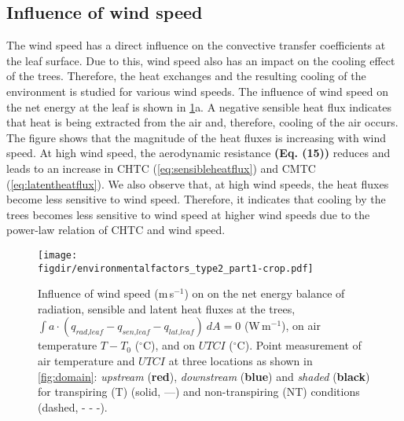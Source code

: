 \subsection{Influence of wind speed}

The wind speed has a direct influence on the convective transfer coefficients at the leaf surface. Due to this, wind speed also has an impact on the cooling effect of the trees. Therefore, the heat exchanges and the resulting cooling of the environment is studied for various wind speeds. The influence of wind speed on the net energy at the leaf is shown in \cref{fig:environmentalfactorspart1}a. A negative sensible heat flux indicates that heat is being extracted from the air and, therefore, cooling of the air occurs. The figure shows that the magnitude of the heat fluxes is increasing with wind speed. At high wind speed, the aerodynamic resistance \textbf{(Eq. (15))} reduces and leads to an increase in CHTC (\cref{eq:sensibleheatflux}) and CMTC (\cref{eq:latentheatflux}). We also observe that, at high wind speeds, the heat fluxes become less sensitive to wind speed. Therefore, it indicates that cooling by the trees becomes less sensitive to wind speed at higher wind speeds due to the power-law relation of CHTC and wind speed. 

	\begin{figure}[t]
	\centering
	\texttt{[image: \\figdir/environmentalfactors\_type2\_part1-crop.pdf]}
	\caption{Influence of wind speed (m\,s$^{-1}$) on   on the net energy balance of radiation, sensible and latent heat fluxes at the trees, $\int a \cdot (q_{\textit{rad,leaf}}-q_{\textit{sen,leaf}}-q_{\textit{lat,leaf}})\ dA = 0$ (W\,m$^{-1}$),  on air temperature $T-T_0$ ($^{\circ}$C), and  on $\textit{UTCI}$ ($^{\circ}$C). Point measurement of air temperature and $UTCI$ at three locations as shown in \cref{fig:domain}: \textit{upstream} ({\color{flatuidarkred}\textbf{red}}), \textit{downstream} ({\color{flatuidarkblue}\textbf{blue}}) and \textit{shaded} (\textbf{black}) for transpiring (T) (solid, ---) and non-transpiring (NT) conditions (dashed, - - -).}
	\label{fig:environmentalfactorspart1}
	\end{figure}
	

